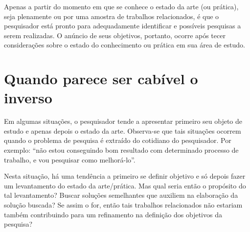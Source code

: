 Apenas a partir do momento em que se conhece o estado da arte (ou prática), seja plenamente ou por uma amostra de trabalhos relacionados, é que o pesquisador está pronto para adequadamente identificar e possíveis pesquisas a serem realizadas. O anúncio de seus objetivos, portanto, ocorre após tecer considerações sobre o estado do conhecimento ou prática em sua área de estudo.

\section{Quando parece ser cabível o inverso}

Em algumas situações, o pesquisador tende a apresentar primeiro seu objeto de estudo e apenas depois o estado da arte. Observa-se que tais situações ocorrem quando o problema de pesquisa é extraído do cotidiano do pesquisador. Por exemplo: “não estou conseguindo bom resultado com determinado processo de trabalho, e vou pesquisar como melhorá-lo”.

Nesta situação, há uma tendência a primeiro se definir objetivo e só depois fazer um levantamento do estado da arte/prática. Mas qual seria então o propósito do tal levantamento? Buscar soluções semelhantes que auxiliem na elaboração da solução buscada? Se assim o for, então tais trabalhos relacionados não estariam também contribuindo para um refinamento na definição dos objetivos da pesquisa?
